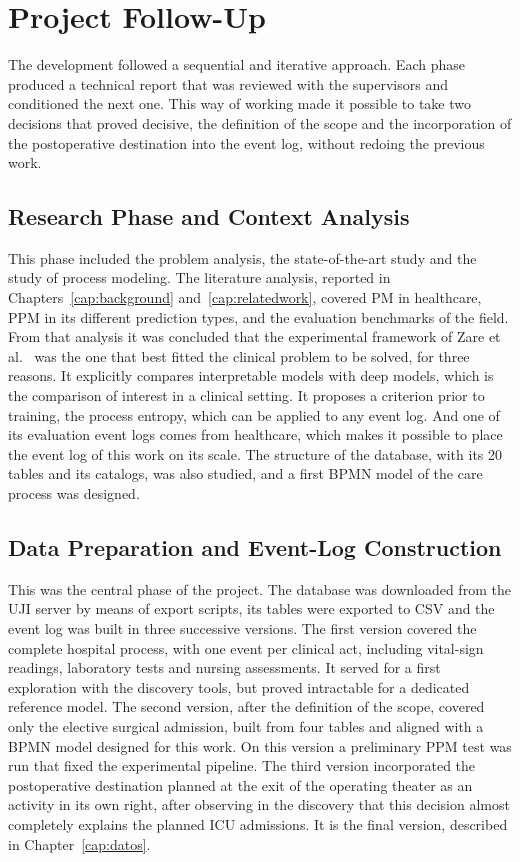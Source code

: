 \section{Project Follow-Up}

The development followed a sequential and iterative approach. Each phase produced a technical report that was reviewed with the supervisors and conditioned the next one. This way of working made it possible to take two decisions that proved decisive, the definition of the scope and the incorporation of the postoperative destination into the event log, without redoing the previous work.

\subsection{Research Phase and Context Analysis}

This phase included the problem analysis, the state-of-the-art study and the study of process modeling. The literature analysis, reported in Chapters~\ref{cap:background} and~\ref{cap:relatedwork}, covered PM in healthcare, PPM in its different prediction types, and the evaluation benchmarks of the field. From that analysis it was concluded that the experimental framework of Zare et al.\ \cite{zare2025} was the one that best fitted the clinical problem to be solved, for three reasons. It explicitly compares interpretable models with deep models, which is the comparison of interest in a clinical setting. It proposes a criterion prior to training, the process entropy, which can be applied to any event log. And one of its evaluation event logs comes from healthcare, which makes it possible to place the event log of this work on its scale. The structure of the  database, with its 20 tables and its catalogs, was also studied, and a first BPMN model of the care process was designed.

\subsection{Data Preparation and Event-Log Construction}

This was the central phase of the project. The database was downloaded from the UJI server by means of export scripts, its tables were exported to CSV and the event log was built in three successive versions. The first version covered the complete hospital process, with one event per clinical act, including vital-sign readings, laboratory tests and nursing assessments. It served for a first exploration with the discovery tools, but proved intractable for a dedicated reference model. The second version, after the definition of the scope, covered only the elective surgical admission, built from four tables and aligned with a BPMN model designed for this work. On this version a preliminary PPM test was run that fixed the experimental pipeline. The third version incorporated the postoperative destination planned at the exit of the operating theater as an activity in its own right, after observing in the discovery that this decision almost completely explains the planned ICU admissions. It is the final version, described in Chapter~\ref{cap:datos}.


